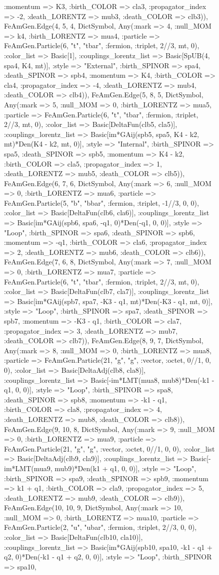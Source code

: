 \documentclass{revtex4}
\begin{document}
\begin{figure}[!htb]
\begin{center}
{:momentum => K3, :birth_COLOR => cla3, :propagator_index => -2, :death_LORENTZ => mub3, :death_COLOR => clb3)), FeAmGen.Edge(4, 5, 4, Dict{Symbol, Any}(:mark => 4, :null_MOM => k4, :birth_LORENTZ => mua4, :particle => FeAmGen.Particle(6, "t", "tbar", :fermion, :triplet, 2//3, mt, 0), :color_list => Basic[1], :couplings_lorentz_list => Basic[SpUB(4, spa4, K4, mt)], :style => "External", :birth_SPINOR => spa4, :death_SPINOR => spb4, :momentum => K4, :birth_COLOR => cla4, :propagator_index => -4, :death_LORENTZ => mub4, :death_COLOR => clb4)), FeAmGen.Edge(5, 8, 5, Dict{Symbol, Any}(:mark => 5, :null_MOM => 0, :birth_LORENTZ => mua5, :particle => FeAmGen.Particle(6, "t", "tbar", :fermion, :triplet, 2//3, mt, 0), :color_list => Basic[DeltaFun(clb5, cla5)], :couplings_lorentz_list => Basic[im*GAij(spb5, spa5, K4 - k2, mt)*Den(K4 - k2, mt, 0)], :style => "Internal", :birth_SPINOR => spa5, :death_SPINOR => spb5, :momentum => K4 - k2, :birth_COLOR => cla5, :propagator_index => 1, :death_LORENTZ => mub5, :death_COLOR => clb5)), FeAmGen.Edge(6, 7, 6, Dict{Symbol, Any}(:mark => 6, :null_MOM => 0, :birth_LORENTZ => mua6, :particle => FeAmGen.Particle(5, "b", "bbar", :fermion, :triplet, -1//3, 0, 0), :color_list => Basic[DeltaFun(clb6, cla6)], :couplings_lorentz_list => Basic[im*GAij(spb6, spa6, -q1, 0)*Den(-q1, 0, 0)], :style => "Loop", :birth_SPINOR => spa6, :death_SPINOR => spb6, :momentum => -q1, :birth_COLOR => cla6, :propagator_index => 2, :death_LORENTZ => mub6, :death_COLOR => clb6)), FeAmGen.Edge(7, 6, 8, Dict{Symbol, Any}(:mark => 7, :null_MOM => 0, :birth_LORENTZ => mua7, :particle => FeAmGen.Particle(6, "t", "tbar", :fermion, :triplet, 2//3, mt, 0), :color_list => Basic[DeltaFun(clb7, cla7)], :couplings_lorentz_list => Basic[im*GAij(spb7, spa7, -K3 - q1, mt)*Den(-K3 - q1, mt, 0)], :style => "Loop", :birth_SPINOR => spa7, :death_SPINOR => spb7, :momentum => -K3 - q1, :birth_COLOR => cla7, :propagator_index => 3, :death_LORENTZ => mub7, :death_COLOR => clb7)), FeAmGen.Edge(8, 9, 7, Dict{Symbol, Any}(:mark => 8, :null_MOM => 0, :birth_LORENTZ => mua8, :particle => FeAmGen.Particle(21, "g", "g", :vector, :octet, 0//1, 0, 0), :color_list => Basic[DeltaAdj(clb8, cla8)], :couplings_lorentz_list => Basic[-im*LMT(mua8, mub8)*Den(-k1 - q1, 0, 0)], :style => "Loop", :birth_SPINOR => spa8, :death_SPINOR => spb8, :momentum => -k1 - q1, :birth_COLOR => cla8, :propagator_index => 4, :death_LORENTZ => mub8, :death_COLOR => clb8)), FeAmGen.Edge(9, 10, 8, Dict{Symbol, Any}(:mark => 9, :null_MOM => 0, :birth_LORENTZ => mua9, :particle => FeAmGen.Particle(21, "g", "g", :vector, :octet, 0//1, 0, 0), :color_list => Basic[DeltaAdj(clb9, cla9)], :couplings_lorentz_list => Basic[-im*LMT(mua9, mub9)*Den(k1 + q1, 0, 0)], :style => "Loop", :birth_SPINOR => spa9, :death_SPINOR => spb9, :momentum => k1 + q1, :birth_COLOR => cla9, :propagator_index => 5, :death_LORENTZ => mub9, :death_COLOR => clb9)), FeAmGen.Edge(10, 10, 9, Dict{Symbol, Any}(:mark => 10, :null_MOM => 0, :birth_LORENTZ => mua10, :particle => FeAmGen.Particle(2, "u", "ubar", :fermion, :triplet, 2//3, 0, 0), :color_list => Basic[DeltaFun(clb10, cla10)], :couplings_lorentz_list => Basic[im*GAij(spb10, spa10, -k1 - q1 + q2, 0)*Den(-k1 - q1 + q2, 0, 0)], :style => "Loop", :birth_SPINOR => spa10, }
\end{center}
\end{figure}
\end{document}
